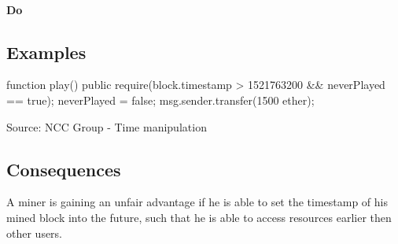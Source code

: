 \paragraph{Do }

\subsection{Examples} 
\begin{solidity}
    function play() public {
        require(block.timestamp > 1521763200 && neverPlayed == true);
        neverPlayed = false;
        msg.sender.transfer(1500 ether);
    }
\end{solidity}
Source: NCC Group - Time manipulation \cite{DASP2018}

\subsection{Consequences}
A miner is gaining an unfair advantage if he is able to set the timestamp of his mined block into the future,
such that he is able to access resources earlier then other users.